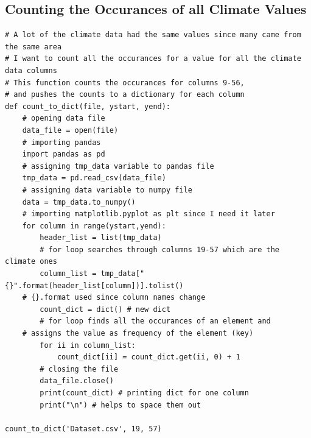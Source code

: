 \documentclass[letterpaper]{article}
\begin{document}
\subsection{Counting the Occurances of all Climate Values}
\begin{verbatim}
# A lot of the climate data had the same values since many came from the same area
# I want to count all the occurances for a value for all the climate data columns
# This function counts the occurances for columns 9-56, 
# and pushes the counts to a dictionary for each column
def count_to_dict(file, ystart, yend):
    # opening data file
    data_file = open(file)
    # importing pandas
    import pandas as pd
    # assigning tmp_data variable to pandas file
    tmp_data = pd.read_csv(data_file)
    # assigning data variable to numpy file
    data = tmp_data.to_numpy()
    # importing matplotlib.pyplot as plt since I need it later
    for column in range(ystart,yend):
        header_list = list(tmp_data)
        # for loop searches through columns 19-57 which are the climate ones
        column_list = tmp_data["{}".format(header_list[column])].tolist() 
	# {}.format used since column names change
        count_dict = dict() # new dict
        # for loop finds all the occurances of an element and 
	# assigns the value as frequency of the element (key)
        for ii in column_list:
            count_dict[ii] = count_dict.get(ii, 0) + 1
        # closing the file
        data_file.close()
        print(count_dict) # printing dict for one column
        print("\n") # helps to space them out

count_to_dict('Dataset.csv', 19, 57)
\end{verbatim}
\end{document}
